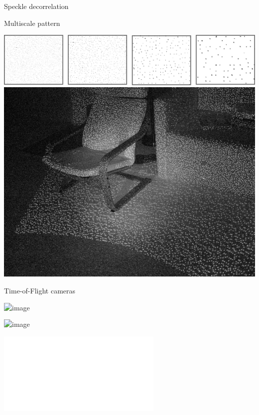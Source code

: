\documentclass[compress]{beamer}
\begin{document}
{
\begin{frame}{Speckle decorrelation}


\end{frame}
}


\begin{frame}{Multiscale pattern}
    \begin{center}
        \includegraphics[width=0.8\linewidth]{multiscale_kinect_pattern}\\
        \includegraphics[width=0.5\linewidth]{kinect_pattern2}

    \end{center}
\end{frame}

{
\begin{frame}{Time-of-Flight cameras}
    \begin{center}
        \includegraphics<1>[width=0.8\linewidth]{kinect_xbox_one}

        \includegraphics<2>[width=0.7\linewidth]{tof2}

        \includegraphics<2->[width=0.7\linewidth]{tof1.pdf}

    \end{center}
\end{frame}
}
\end{document}
